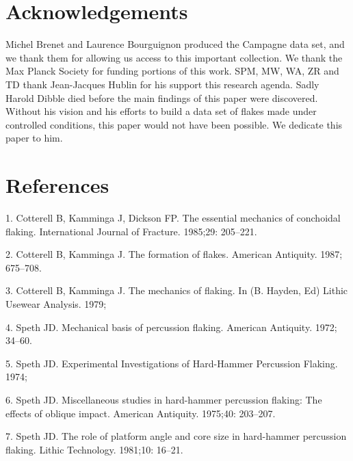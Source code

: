 \documentclass[10pt,letterpaper]{article}
\begin{document}
\hypertarget{acknowledgements}{%
\section{Acknowledgements}\label{acknowledgements}}

Michel Brenet and Laurence Bourguignon produced the Campagne data set,
and we thank them for allowing us access to this important collection.
We thank the Max Planck Society for funding portions of this work. SPM,
MW, WA, ZR and TD thank Jean-Jacques Hublin for his support this
research agenda. Sadly Harold Dibble died before the main findings of
this paper were discovered. Without his vision and his efforts to build
a data set of flakes made under controlled conditions, this paper would
not have been possible. We dedicate this paper to him.

\hypertarget{references}{%
\section*{References}\label{references}}

\hypertarget{refs}{}
\leavevmode\hypertarget{ref-cotterell_essential_1985}{}%
1. Cotterell B, Kamminga J, Dickson FP. The essential mechanics of
conchoidal flaking. International Journal of Fracture. 1985;29:
205--221.

\leavevmode\hypertarget{ref-cotterell_formation_1987}{}%
2. Cotterell B, Kamminga J. The formation of flakes. American Antiquity.
1987; 675--708.

\leavevmode\hypertarget{ref-cotterell_mechanics_1979}{}%
3. Cotterell B, Kamminga J. The mechanics of flaking. In (B. Hayden, Ed)
Lithic Usewear Analysis. 1979;

\leavevmode\hypertarget{ref-speth_mechanical_1972}{}%
4. Speth JD. Mechanical basis of percussion flaking. American Antiquity.
1972; 34--60.

\leavevmode\hypertarget{ref-speth_experimental_1974}{}%
5. Speth JD. Experimental Investigations of Hard-Hammer Percussion
Flaking. 1974;

\leavevmode\hypertarget{ref-speth_miscellaneous_1975}{}%
6. Speth JD. Miscellaneous studies in hard-hammer percussion flaking:
The effects of oblique impact. American Antiquity. 1975;40: 203--207.

\leavevmode\hypertarget{ref-speth_role_1981}{}%
7. Speth JD. The role of platform angle and core size in hard-hammer
percussion flaking. Lithic Technology. 1981;10: 16--21.
\end{document}
